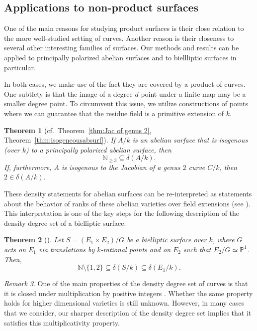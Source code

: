 \documentclass[a4paper,11pt]{amsart}
\theoremstyle{plain}
\newtheorem{thm}{Theorem}[section]
\theoremstyle{remark}
\newtheorem{remark}[thm]{Remark}
\newcommand{\nn}{\mathbb{N}}
\newcommand{\dendegs}{\delta}
\begin{document}
\subsection{Applications to non-product surfaces}
One of the main reasons for studying product surfaces is their close relation to the more well-studied setting of curves. 
Another reason is their closeness to several other interesting families of surfaces. Our methods and results can be applied to principally polarized abelian surfaces and to biellliptic surfaces in particular.

In both cases, we make use of the fact they are covered by a product of curves.  One subtlety is that the image of a degree \(d\) point under a finite map may be a smaller degree point.  To circumvent this issue, we  utilize constructions of points where we can guarantee that the residue field is a primitive extension of \(k\). 

\begin{thm}[{cf.~Theorem~\ref{thm:Jac of genus 2}, Theorem~\ref{thm:isogeneousabsurf}}]
    If \(A/k\) is an abelian surface that is isogenous (over \(k\)) to a principally polarized abelian surface, then
    \[\nn_{\geq 3} \subseteq \dendegs(A/k).\]
    If, furthermore, \(A\) is isogenous to the Jacobian of a genus \(2\) curve \(C/k\), then \(2 \in \dendegs(A/k)\).
\end{thm}

These density statements for abelian surfaces can be re-interpreted as statements about the behavior of ranks of these abelian varieties over field extensions (see ). This interpretation is one of the key steps for the following description of the density degree set of a bielliptic surface.

\begin{thm}[{}]
    Let $S = (E_1 \times E_2) / G$ be a bielliptic surface over $k$, where $G$ acts on $E_1$ via translations by $k$-rational points and on $E_2$ such that $E_2/G\simeq \mathbb{P}^1$. Then,
    $$\mathbb{N} \setminus \{1, 2\} \subseteq \dendegs(S/k) \subseteq \dendegs(E_1 / k).$$
\end{thm}

\begin{remark}
One of the main properties of the density degree set of curves is that it is closed under multiplication by positive integers \cite[Section 5.2.1]{VV}.
Whether the same property holds for higher dimensional varieties is still unknown.
However, in many cases that we consider, our sharper description of the density degree set implies that it satisfies this multiplicativity property.
\end{remark}
\end{document}
